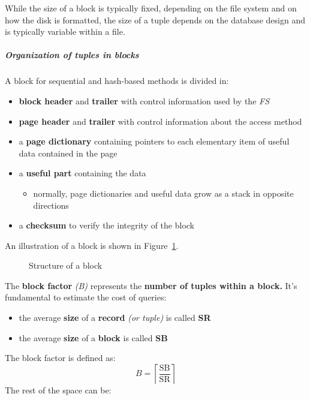 \documentclass[english]{article}
\begin{document}
While the size of a block is typically fixed, depending on the file system and on how the disk is formatted, the size of a tuple depends on the database design and is typically variable within a file.

\subparagraph*{Organization of tuples in blocks}

A block for sequential and hash-based methods is divided in:

\begin{itemize}
  \item \textbf{block header} and \textbf{trailer} with control information used by the \textit{FS}
  \item \textbf{page header} and \textbf{trailer} with control information about the access method
  \item a \textbf{page dictionary} containing pointers to each elementary item of useful data contained in the page
  \item a \textbf{useful part} containing the data
        \begin{itemize}
          \item normally, page dictionaries and useful data grow as a stack in opposite directions
        \end{itemize}
  \item a \textbf{checksum} to verify the integrity of the block
\end{itemize}

An illustration of a block is shown in Figure~\ref{fig:block-structure}.

\begin{figure}[htbp]
  \centering
  \bigskip
  \caption{Structure of a block}
  \label{fig:block-structure}
  \bigskip
\end{figure}

\bigskip
The \textbf{block factor} \textit{(B)} represents the \textbf{number of tuples within a block.}
It's fundamental to estimate the cost of queries:

\begin{itemize}
  \item the average \textbf{size} of a \textbf{record} \textit{(or tuple)} is called \textbf{SR}
  \item the average \textbf{size} of a \textbf{block} is called \textbf{SB}
\end{itemize}

The block factor is defined as:
\[ B = \left\lceil \frac{\text{SB}}{\text{SR}} \right\rceil \]
The rest of the space can be:
\end{document}

